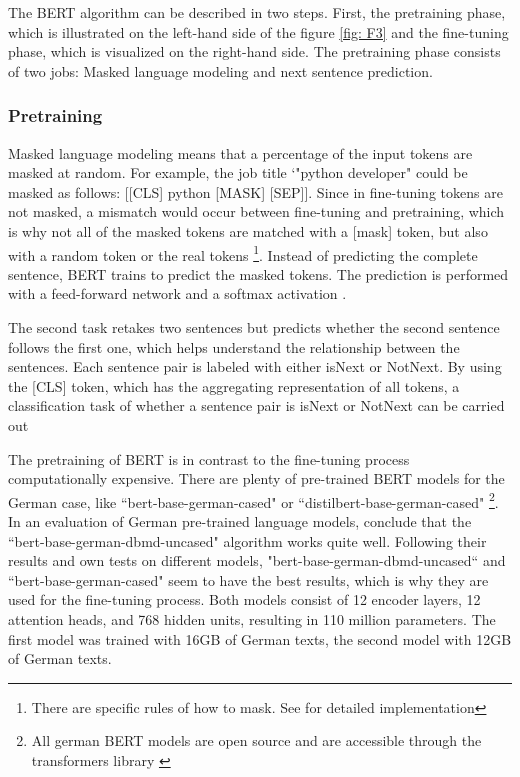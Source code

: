 \documentclass[12pt, a4paper, titlepage]{article}
\begin{document}
The \ac{BERT} algorithm can be described in two steps. First, the pretraining phase, which is illustrated on the left-hand side of the figure \ref{fig: F3} and the fine-tuning phase, which is visualized on the right-hand side. The pretraining phase consists of two jobs: Masked language modeling and next sentence prediction. 

\subsubsection*{Pretraining}
Masked language modeling means that a percentage of the input tokens are masked at random. For example, the job title `"python developer" could be masked as follows: [[CLS] python [MASK] [SEP]]. Since in fine-tuning tokens are not masked, a mismatch would occur between fine-tuning and pretraining, which is why not all of the masked tokens are matched with a [mask] token, but also with a random token or the real tokens \footnote{There are specific rules of how to mask. See \citet{devlin2018} for detailed implementation}. Instead of predicting the complete sentence, \ac{BERT} trains to predict the masked tokens. The prediction is performed with a feed-forward network and a softmax activation \citep{devlin2018,ravichandiran2021}. 

The second task retakes two sentences but predicts whether the second sentence follows the first one, which helps understand the relationship between the sentences. Each sentence pair is labeled with either isNext or NotNext. By using the [CLS] token, which has the aggregating representation of all tokens, a classification task of whether a sentence pair is isNext or NotNext can be carried out \citep{ravichandiran2021,devlin2018}

The pretraining of \ac{BERT} is in contrast to the fine-tuning process computationally expensive. There are plenty of pre-trained \ac{BERT} models for the German case, like ``bert-base-german-cased" or ``distilbert-base-german-cased" \footnote{All german \ac{BERT} models are open source and are accessible through the transformers library \citep{wolf2020}}. In an evaluation of German pre-trained language models, \citep{assenmacher2021} conclude that the ``bert-base-german-dbmd-uncased" algorithm works quite well. Following their results and own tests on different models, "bert-base-german-dbmd-uncased`` and ``bert-base-german-cased" seem to have the best results, which is why they are used for the fine-tuning process. Both models consist of 12 encoder layers, 12 attention heads, and 768 hidden units, resulting in 110 million parameters. The first model was trained with 16GB of German texts, the second model with 12GB of German texts. 
\end{document}
